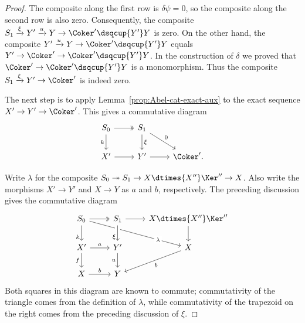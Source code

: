 \begin{proof}
	The composite along the first row is $\delta\psi=0$, so the composite along
	the second row is also zero. Consequently, the composite
	$S_1\xrightarrow{\xi}Y'\xrightarrow{u}Y\to\Coker'\dsqcup{Y'}Y$ is zero.
	On the other hand, the composite
	$Y'\xrightarrow{u}Y\to\Coker'\dsqcup{Y'}Y$ equals
	$Y'\to\Coker'\to\Coker'\dsqcup{Y'}Y$. In the construction of $\delta$ we
	proved that $\Coker'\to\Coker'\dsqcup{Y'}Y$ is a monomorphism. Thus the
	composite $S_1\xrightarrow{\xi}Y'\to\Coker'$ is indeed zero.

	The next step is to apply Lemma~\ref{prop:Abel-cat-exact-aux} to the exact
	sequence $X'\to Y'\to\Coker'$. This gives a commutative diagram
	\[\begin{tikzcd}
		S_0 \arrow[twoheadrightarrow, r] \arrow[d, "k"'] & S_1 \arrow[d, "\xi"] \arrow[rd, "0"] & \\
		X' \arrow[r] & Y' \arrow[r] & \Coker' .
	\end{tikzcd}\]

	Write $\lambda$ for the composite
	$S_0\twoheadrightarrow S_1\to X\dtimes{X''}\Ker''\to X$. Also write the
	morphisms $X'\to Y'$ and $X\to Y$ as $a$ and $b$, respectively. The
	preceding discussion gives the commutative diagram
	\[\begin{tikzcd}
		S_0 \arrow[twoheadrightarrow, r] \arrow[d, "k"' near end] \arrow[rrd, "\lambda" description, near end] & S_1 \arrow[d, crossing over, "\xi"' near end] \arrow[r] & X \dtimes{X''} \Ker'' \arrow[d] \\
		X' \arrow[r, "a"] \arrow[d, "f"'] & Y' \arrow[d, "u"'] & X \arrow[ld, "b"] \\
		X \arrow[r, "b"] & Y &
	\end{tikzcd}\]
	Both squares in this diagram are known to commute; commutativity of the
	triangle comes from the definition of $\lambda$, while commutativity of the
	trapezoid on the right comes from the preceding discussion of $\xi$.
	

\end{proof}
